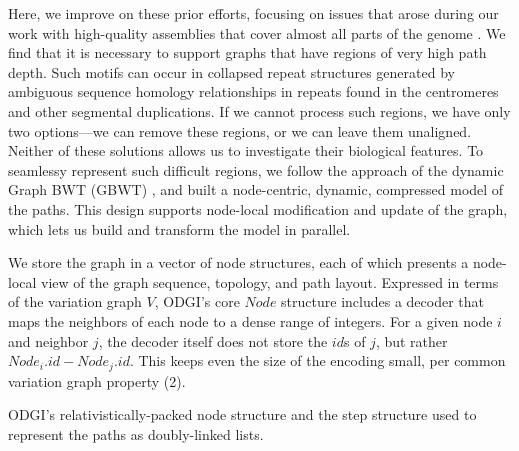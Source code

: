 \documentclass{bioinfo}
\begin{document}
Here, we improve on these prior efforts, focusing on issues that arose during our work with high-quality assemblies that cover almost all parts of the genome \citep{Logsdon_2021,Nurk_2021}.
We find that it is necessary to support graphs that have regions of very high path depth.
Such motifs can occur in collapsed repeat structures generated by ambiguous sequence homology relationships in repeats found in the centromeres and other segmental duplications.
If we cannot process such regions, we have only two options---we can remove these regions, or we can leave them unaligned.
Neither of these solutions allows us to investigate their biological features.
To seamlessy represent such difficult regions, we follow the approach of the dynamic Graph BWT (GBWT) \citep{Siren:2020}, and built a node-centric, dynamic, compressed model of the paths.
This design supports node-local modification and update of the graph, which lets us build and transform the model in parallel.

We store the graph in a vector of node structures, each of which presents a node-local view of the graph sequence, topology, and path layout.
Expressed in terms of the variation graph $V$, ODGI's core $Node$ structure includes a decoder that maps the neighbors of each node to a dense range of integers.
For a given node $i$ and neighbor $j$, the decoder itself does not store the $id$s of $j$, but rather $Node_i.id - Node_j.id$.
This keeps even the size of the encoding small, per common variation graph property (2).


\begin{algorithm}
\caption{ODGI's relativistically-packed node structure and the step structure used to represent the paths as doubly-linked lists.}
\end{algorithm}
\end{document}
